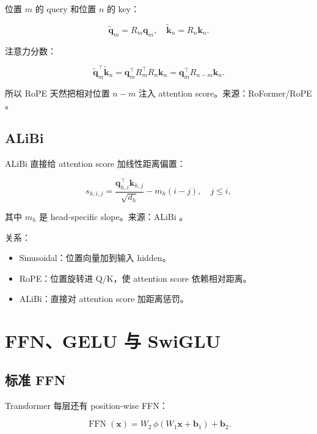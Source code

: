 \documentclass[UTF8,12pt]{ctexart}
\newcommand{\1}{\mathbf{1}}
\newcommand{\FFN}{\operatorname{FFN}}
\begin{document}
位置 $m$ 的 query 和位置 $n$ 的 key：

\begin{equation}
\tilde{\bm{q}}_m=R_m\bm{q}_m,\quad
\tilde{\bm{k}}_n=R_n\bm{k}_n.
\end{equation}

注意力分数：

\begin{equation}
\tilde{\bm{q}}_m^\top \tilde{\bm{k}}_n
=\bm{q}_m^\top R_m^\top R_n\bm{k}_n
=\bm{q}_m^\top R_{n-m}\bm{k}_n.
\label{eq:rope-relative}
\end{equation}

所以 RoPE 天然把相对位置 $n-m$ 注入 attention score。来源：RoFormer/RoPE \cite{su2021rope}。

\subsection{ALiBi}

ALiBi 直接给 attention score 加线性距离偏置：

\begin{equation}
s_{h,i,j}
=\frac{\bm{q}_{h,i}^\top \bm{k}_{h,j}}{\sqrt{d_h}}
-m_h(i-j),
\quad j\le i,
\end{equation}

其中 $m_h$ 是 head-specific slope。来源：ALiBi \cite{press2021alibi}。

关系：

\begin{itemize}
  \item Sinusoidal：位置向量加到输入 hidden。
  \item RoPE：位置旋转进 Q/K，使 attention score 依赖相对距离。
  \item ALiBi：直接对 attention score 加距离惩罚。
\end{itemize}

\section{FFN、GELU 与 SwiGLU}

\subsection{标准 FFN}

Transformer 每层还有 position-wise FFN：

\begin{equation}
\FFN(\bm{x})
=W_2\,\phi(W_1\bm{x}+\bm{b}_1)+\bm{b}_2.
\end{equation}
\end{document}
